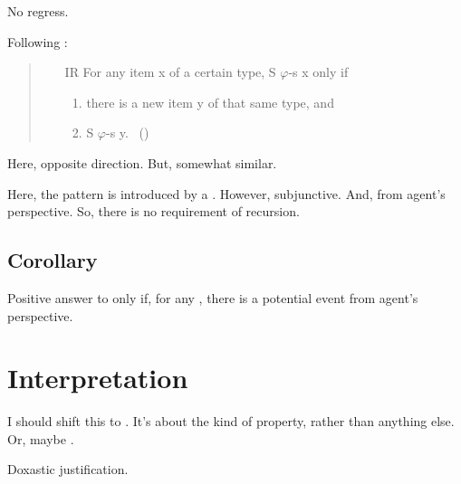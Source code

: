 \begin{note}
  No regress.

  Following \citeauthor{Wieland:2013vf}:

  \begin{quote}
    \begin{itemize}[noitemsep]
    \item[IR]
      For any item x of a certain type, S \(\varphi\)-s x only if
      \begin{enumerate}[label=(\roman*),noitemsep]
      \item
        there is a new item y of that same type, and
      \item
        S \(\varphi\)-s y.%
        \mbox{ }\hfill\mbox{(\citeyear[996]{Wieland:2013vf})}
      \end{enumerate}
    \end{itemize}
  \end{quote}

  Here, opposite direction.
  But, somewhat similar.

  Here, the pattern is introduced by a \requ{}.
  However, subjunctive.
  And, from agent's perspective.
  So, there is no requirement of recursion.
\end{note}

\subsection{Corollary}
\label{cha:zSpA:sec:corollary}

\begin{note}
  \begin{corollary}
    \label{corr:prop:PWEs}
    Positive answer to \qzS{} only if, for any \requ{}, there is a potential event from agent's perspective.
  \end{corollary}
\end{note}

\section{Interpretation}
\label{cha:zSpA:sec:interpretation}

{
  \color{red}
  I should shift this to \qzS{}.
  It's about the kind of property, rather than anything else.
  Or, maybe .
}

\begin{note}


  Doxastic justification.
\end{note}

